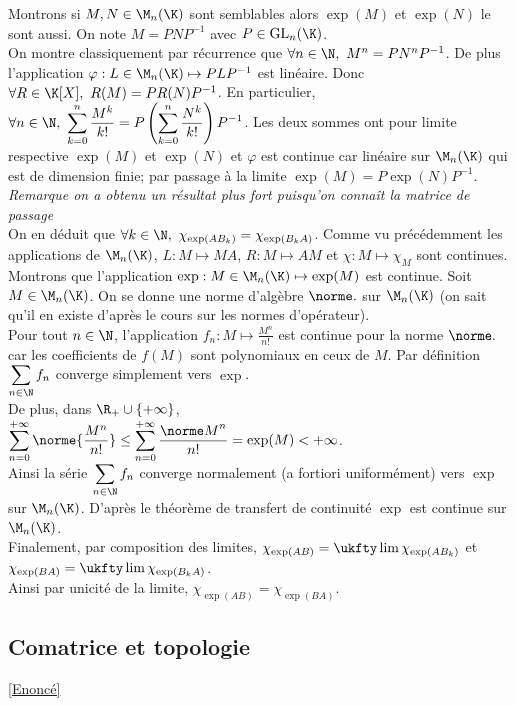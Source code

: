 \documentclass{book}
\begin{document}
\begin{enumerate}[leftmargin=*]
		Montrons si $M,N\in \M_n(\K)$ sont semblables alors $\exp(M)$ et $\exp(N)$ le sont aussi. On note $M=PNP^{-1}$ avec $P\in \text{GL}_n(\K)$.\\
		On montre classiquement par récurrence que $\forall n\in \N,\ M^n=PN^nP^{-1}$. De plus l'application $\varphi : L\in \M_n(\K)\mapsto PLP^{-1}$ est linéaire. Donc $\forall R\in \K[X],\ R(M)=PR(N)P^{-1}$. En particulier, $\forall n\in \N,\ \displaystyle\sum_{k=0}^n\frac{M^k}{k!}=P\left(\sum_{k=0}^n\frac{N^k}{k!}\right)P^{-1}$. Les deux sommes ont pour limite respective $\exp(M)$ et $\exp(N)$ et $\varphi$ est continue car linéaire sur $\M_n(\K)$ qui est de dimension finie; par passage à la limite $\exp(M)=P\exp(N)P^{-1}$.\\
		\textit{Remarque on a obtenu un résultat plus fort puisqu'on connaît la matrice de passage}\\
		On en déduit que $\forall k\in \N,\ \chi_{\exp(AB_k)}=\chi_{\exp(B_kA)}$. Comme vu précédemment les applications de $\M_n(\K)$, $L:M\mapsto MA$, $R:M\mapsto AM$ et $\chi:M\mapsto \chi_M$ sont continues.\\
		Montrons que l'application $\exp:M\in \M_n(\K)\mapsto\exp(M)$ est continue. Soit $M\in \M_n(\K)$. On se donne une norme d'algèbre $\norme.$ sur $\M_n(\K)$ (on sait qu'il en existe d'après le cours sur les normes d'opérateur).\\
		Pour tout $n\in \N$, l'application $f_n:M\mapsto \displaystyle\frac{M^n}{n!}$ est continue pour la norme $\norme.$ car les coefficients de $f(M)$ sont polynomiaux en ceux de $M$. Par définition $\displaystyle\sum_{n\in \N}f_n$ converge simplement vers $\exp$.\\
		De plus, dans $\R_+\cup\{+\infty\}$, $\displaystyle\sum_{n=0}^{+\infty}\norme{\frac{M^n}{n!}}\leq \sum_{n=0}^{+\infty}\frac{{\norme M}^n}{n!}=\exp(M)<+\infty$.\\
		Ainsi la série $\displaystyle\sum_{n\in \N}f_n$ converge normalement (a fortiori uniformément) vers $\exp$ sur $\M_n(\K)$. D'après le théorème de transfert de continuité $\exp$ est continue sur $\M_n(\K)$.\\
		Finalement, par composition des limites, $\chi_{\exp(AB)}=\ukfty\lim\chi_{\exp(AB_k)}$ et $\chi_{\exp(BA)}=\ukfty\lim\chi_{\exp(B_kA)}$.\\
		Ainsi par unicité de la limite, $\chi_{\exp(AB)}=\chi_{\exp(BA)}$.
	\end{enumerate}
	
	\subsection{Comatrice et topologie}
	\label{sec:comatrice-et-topologie}
	\textcolor{blue}{\hyperref[Comatrice et toplogie]{[Enoncé]}}\\
	
\end{document}
